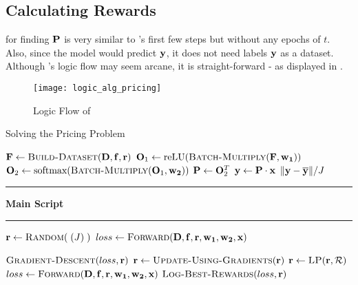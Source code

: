 \subsection{Calculating Rewards} \label{sec:Calculating Rewards}
 for finding $\mathbf{P}$ is very similar to 's first few steps but without any epochs of $t$. Also, since the model would predict $\mathbf{y}$, it does not need labels $\mathbf{y}$ as a dataset. Although 's logic flow may seem arcane, it is straight-forward - as displayed in .
\begin{figure}[!htbp]
    \centering
    \texttt{[image: logic\_alg\_pricing]}
    \caption{Logic Flow of }
    \label{fig:Logic Flow of Algorithm Pricing Problem}
\end{figure}
\begin{algorithm}[!htbp]
    \caption{Solving the Pricing Problem} \label{alg:Solving the Pricing Problem}
    \begin{algorithmic}[1]
            \State $\matr{F} \gets \Call{Build-Dataset}{\matr{D}, \matr{f}, \vect{r}}$
            \State $\matr{O}_1 \gets \text{reLU}(\Call{Batch-Multiply}{\matr{F}, \matr{w_1}})$
            \State $\matr{O}_2 \gets \text{softmax}(\Call{Batch-Multiply}{\matr{O}_1, \matr{w_2}})$
            \State $\mathbf{P} \gets \mathbf{O}_2^T$
            \State $\mathbf{y} \gets \mathbf{P} \cdot \mathbf{x}$
            \State \Return $\lVert \mathbf{y} - \overline{\mathbf{y}} \rVert / J$
        \EndFunction
        \vspace*{-.7\baselineskip}\Statex\hspace*{\dimexpr-\algorithmicindent-2pt\relax}\rule{\textwidth}{0.1pt}%
        \Statex\hspace*{-\algorithmicindent}\textbf{Main Script}%
        \vspace*{-.6\baselineskip}\Statex\hspace*{\dimexpr-\algorithmicindent-2pt\relax}\rule{\textwidth}{0.1pt}%
        \State $\vect{r} \gets \Call{Random}{\;(J)\;}$
        \State $loss \gets \Call{Forward}{\matr{D}, \matr{f}, \vect{r}, \matr{w_1}, \matr{w_2}, \vect{x}}$
            
        \State $\Call{Gradient-Descent}{loss, \vect{r}}$
        \State $\vect{r} \gets \Call{Update-Using-Gradients}{\vect{r}}$
        \State $\vect{r} \gets \Call{LP}{\vect{r}, \mathcal{R}}$
        \State $loss \gets \Call{Forward}{\matr{D}, \matr{f}, \vect{r}, \matr{w_1}, \matr{w_2}, \vect{x}}$
        \State $\Call{Log-Best-Rewards}{loss, \vect{r}}$
        \EndFor
    \end{algorithmic}
\end{algorithm}


